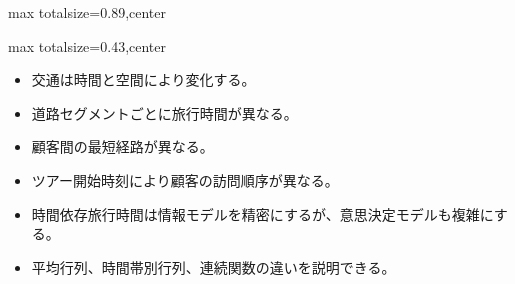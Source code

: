 \begin{minipage}[t]{0.58\textwidth}
\begin{adjustbox}{max totalsize={\textwidth}{0.89\textheight},center}
\begin{minipage}{\textwidth}
\end{minipage}
\end{adjustbox}
\end{minipage}


\clearpage
{}
\begin{minipage}[t]{0.405\textwidth}
\begin{adjustbox}{max totalsize={\textwidth}{0.43\textheight},center}
\begin{minipage}{\textwidth}\scriptsize
{}\begin{itemize}
\item 交通は時間と空間により変化する。
\item 道路セグメントごとに旅行時間が異なる。
\item 顧客間の最短経路が異なる。
\item ツアー開始時刻により顧客の訪問順序が異なる。
\end{itemize}\begin{itemize}
\item 時間依存旅行時間は情報モデルを精密にするが、意思決定モデルも複雑にする。
\item 平均行列、時間帯別行列、連続関数の違いを説明できる。
\end{itemize}
\end{minipage}
\end{adjustbox}
\end{minipage}\hfill
